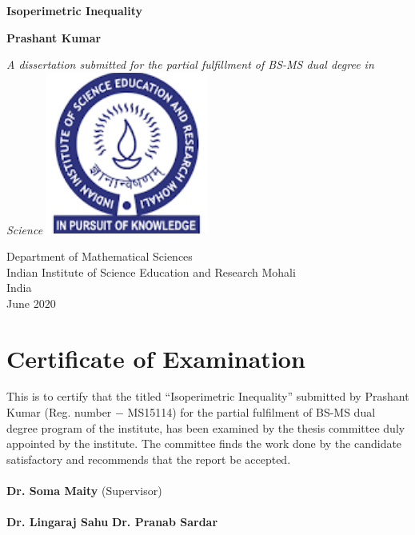 \documentclass[oneside]{book}
\date{\today}
\begin{document}
	
	\begin{titlepage}
		\begin{center}
			\vspace*{1cm}
			
			\Huge
			\textbf{Isoperimetric Inequality}
			
			\vspace{0.5cm}
			\LARGE
			
			
			\vspace{1.5cm}
			
			\textbf{Prashant Kumar}
			
			\vfill
			
			\textit{A dissertation submitted for the partial fulfillment of BS-MS dual degree in Science}          
			\vspace{0.9cm}
			\includegraphics[width=0.4\textwidth]{iiser logo.png}        
			
			\Large
			Department of Mathematical Sciences\\
			Indian Institute of Science Education and Research Mohali\\
			India\\
			June 2020
			
		\end{center}
	\end{titlepage}
	
	
	
	
	
	\tableofcontents
	
	
	\thispagestyle{empty}
	\chapter*{Certificate of Examination}
	
	This is to certify that the titled \enquote{Isoperimetric Inequality} submitted by Prashant Kumar (Reg. number $-$ MS15114) for the partial fulfilment of BS-MS dual degree program of the institute, has been examined by the thesis committee duly appointed by the institute. The committee finds the work done by the candidate satisfactory and recommends that the report be accepted.\\\\
	\textbf{Dr. Soma Maity} (Supervisor)\\
	\\
	\textbf{Dr. Lingaraj Sahu}  \hfill           \textbf{ Dr. Pranab Sardar}\\
	\\
	\\
	\thispagestyle{empty}
	
\end{document}
